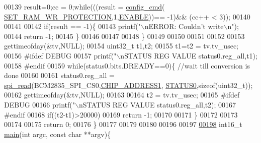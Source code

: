 \begin{DoxyCode}
00139            result=0;cc = 0;\textcolor{keywordflow}{while}(((result = \hyperlink{a00005_ga369ee0e8379941cbc2c79b90ec3292da}{config\_cmd}(
      \hyperlink{a00043_a5b534b9caab512045a6e762f3930a501}{SET\_RAM\_WR\_PROTECTION},1,\hyperlink{a00037_a514ad415fb6125ba296793df7d1a468a}{ENABLE}))== -1)&& (cc++ < 3)); 
00140          
00141            
00142            \textcolor{keywordflow}{if}(result == -1)\{
00143                     printf(\textcolor{stringliteral}{"\(\backslash\)nERROR: Couldn't write\(\backslash\)n"});  
00144                     \textcolor{keywordflow}{return} -1;
00145            \}
00146            
00147             
00148            \}
00149            
00150            
00151            
00152         
00153            gettimeofday(&tv,NULL);
00154            uint32\_t t1,t2;
00155            t1=t2 = tv.tv\_usec;  
00156 \textcolor{preprocessor}{           #ifdef DEBUG            }
00157 \textcolor{preprocessor}{}           printf(\textcolor{stringliteral}{"\(\backslash\)nSTATUS REG VALUE %
      status0.reg\_all,t1);
00158 \textcolor{preprocessor}{           #endif}
00159 \textcolor{preprocessor}{}           \textcolor{keywordflow}{while}(status0.bits.DREADY==0)\{ \textcolor{comment}{//wait till conversion is done}
00160          
00161              status0.reg\_all = \hyperlink{a00007_ga7ad9f65ee46aca507374096506a0b1c4}{spi\_read}(BCM2835\_SPI\_CS0,\hyperlink{a00037_a94de2b046db6e10257ef4481c0a15eaa}{CHIP\_ADDRESS1},
      \hyperlink{a00036_aaf584f70289e5fd799fef97c85bb97ee}{STATUS0},\textcolor{keyword}{sizeof}(uint32\_t));
00162              gettimeofday(&tv,NULL);
00163              
00164              t2 = tv.tv\_usec;   
00165 \textcolor{preprocessor}{             #ifdef DEBUG }
00166 \textcolor{preprocessor}{}             printf(\textcolor{stringliteral}{"\(\backslash\)nSTATUS REG VALUE %
      status0.reg\_all,t2);  
00167 \textcolor{preprocessor}{             #endif}
00168 \textcolor{preprocessor}{}             \textcolor{keywordflow}{if}((t2-t1)>20000)
00169              \textcolor{keywordflow}{return} -1;
00170              
00171            \}
00172            
00173            
00174 
00175   \textcolor{keywordflow}{return} 0;
00176 \}
00177 
00179  
00180 
00196 
00197 
\hypertarget{a00035_source_l00198}{}\hyperlink{a00003_ga3ba649a584853038d5fd50ad1751379d}{00198} int16\_t \hyperlink{a00003_ga3ba649a584853038d5fd50ad1751379d}{main}(\textcolor{keywordtype}{int} argc, \textcolor{keyword}{const} \textcolor{keywordtype}{char} **argv)\{
}}
\end{DoxyCode}
